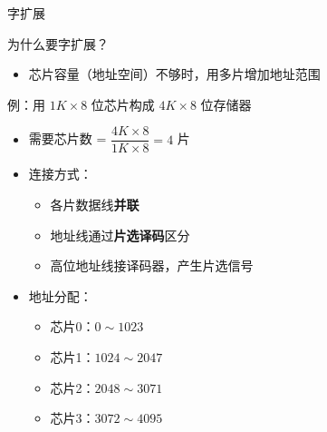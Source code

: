 \documentclass[10pt, aspectratio=169]{beamer}
\begin{document}
\begin{frame}{字扩展}
    \begin{block}{为什么要字扩展？}
        \begin{itemize}
            \item 芯片容量（地址空间）不够时，用多片增加地址范围
        \end{itemize}
    \end{block}
    \vspace{0.3em}
    \begin{exampleblock}{例：用 $1K \times 8$ 位芯片构成 $4K \times 8$ 位存储器}
        \begin{itemize}
            \item 需要芯片数 = $\dfrac{4K \times 8}{1K \times 8} = 4$ 片
            \item 连接方式：
            \begin{itemize}
                \item 各片数据线\textbf{并联}
                \item 地址线通过\textbf{片选译码}区分
                \item 高位地址线接译码器，产生片选信号
            \end{itemize}
            \item 地址分配：
            \begin{itemize}
                \item 芯片0：$0 \sim 1023$
                \item 芯片1：$1024 \sim 2047$
                \item 芯片2：$2048 \sim 3071$
                \item 芯片3：$3072 \sim 4095$
            \end{itemize}
        \end{itemize}
    \end{exampleblock}
\end{frame}
\end{document}
